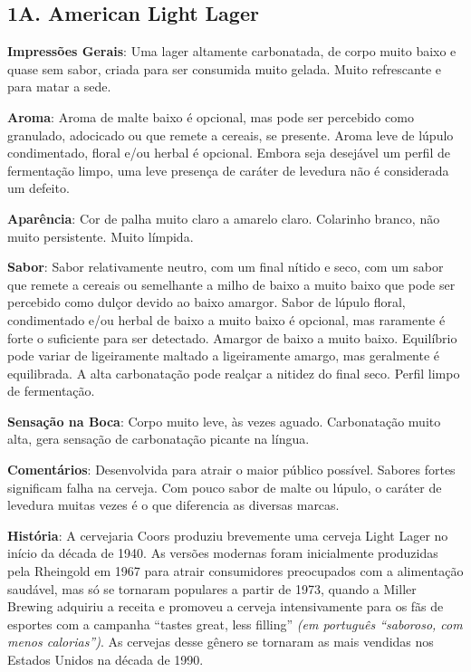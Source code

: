 \subsection*{1A. American Light Lager}
\textbf{Impressões Gerais}: Uma lager altamente carbonatada, de corpo muito baixo e quase sem sabor, criada para ser consumida muito gelada. Muito refrescante e para matar a sede.

\textbf{Aroma}: Aroma de malte baixo é opcional, mas pode ser percebido como granulado, adocicado ou que remete a cereais, se presente. Aroma leve de lúpulo condimentado, floral e/ou herbal é opcional. Embora seja desejável um perfil de fermentação limpo, uma leve presença de caráter de levedura não é considerada um defeito.

\textbf{Aparência}: Cor de palha muito claro a amarelo claro. Colarinho branco, não muito persistente. Muito límpida.

\textbf{Sabor}: Sabor relativamente neutro, com um final nítido e seco, com um sabor que remete a cereais ou semelhante a milho de baixo a muito baixo que pode ser percebido como dulçor devido ao baixo amargor. Sabor de lúpulo floral, condimentado e/ou herbal de baixo a muito baixo é opcional, mas raramente é forte o suficiente para ser detectado. Amargor de baixo a muito baixo. Equilíbrio pode variar de ligeiramente maltado a ligeiramente amargo, mas geralmente é equilibrada. A alta carbonatação pode realçar a nitidez do final seco. Perfil limpo de fermentação.

\textbf{Sensação na Boca}: Corpo muito leve, às vezes aguado. Carbonatação muito alta, gera sensação de carbonatação picante na língua.

\textbf{Comentários}: Desenvolvida para atrair o maior público possível. Sabores fortes significam falha na cerveja. Com pouco sabor de malte ou lúpulo, o caráter de levedura muitas vezes é o que diferencia as diversas marcas.

\textbf{História}: A cervejaria Coors produziu brevemente uma cerveja Light Lager no início da década de 1940. As versões modernas foram inicialmente produzidas pela Rheingold em 1967 para atrair consumidores preocupados com a alimentação saudável, mas só se tornaram populares a partir de 1973, quando a Miller Brewing adquiriu a receita e promoveu a cerveja intensivamente para os fãs de esportes com a campanha “tastes great, less filling” \textit{(em português “saboroso, com menos calorias”)}. As cervejas desse gênero se tornaram as mais vendidas nos Estados Unidos na década de 1990.

